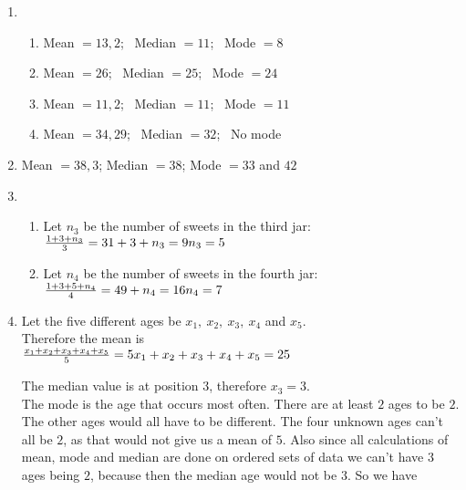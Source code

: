  \begin{solutions}{}{
\begin{enumerate}[itemsep=5pt, label=\textbf{\arabic*}. ] 


\item %
      \begin{enumerate}[noitemsep, label=\textbf{(\alph*)} ]
\item Mean $= 13,2$; ~Median $= 11$;~ Mode $= 8$ %
\item Mean $= 26$;~ Median $= 25$; ~Mode $= 24$%
\item Mean $=11,2$; ~Median $= 11$;~ Mode $=11$%
\item Mean $=34,29$; ~Median $=32$;~ No mode%
    \end{enumerate}
\item %
Mean $=38,3$; Median $= 38$; Mode $= 33$ and $42$\\
\item %
       \begin{enumerate}[noitemsep, label=\textbf{(\alph*)} ]
\item Let $n_3$ be the number of sweets in the third jar:\\
$\frac{1+3+n_3}{3}=3\\
1+3+n_3=9\\
n_3=5$\\

\item Let $n_4$ be the number of sweets in the fourth jar:\\
$\frac{1+3+5+n_4}4=4\\
9+n_4=16\\
n_4=7$
    \end{enumerate}

\item %
Let the five different ages be $x_1,~x_2,~x_3,~x_4$ and $x_5$.\\
Therefore the mean is\\

$\frac{x_1+x_2+x_3+x_4+x_5}{5}=5\\
x_1+x_2+x_3+x_4+x_5=25\\$
 
The median value is at position $3$, therefore $x_3=3$.\\

The mode is the age that occurs most often. There are at least $2$ ages to be $2$. The other ages would all have to be different. The four unknown ages can't all be $2$, as that would not give us a mean of $5$. Also since all calculations of mean, mode and median are done on ordered sets of data we can't have $3$ ages being $2$, because then the median age would not be $3$. So we have \\


\end{enumerate}}
\end{solutions}
